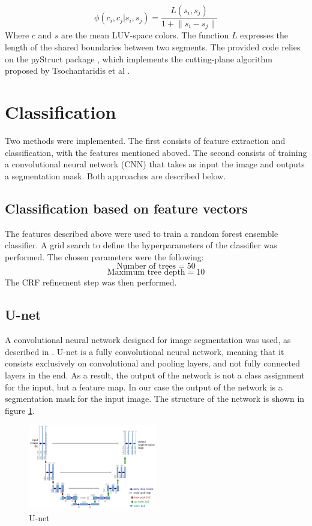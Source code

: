 \documentclass[10pt,conference,compsocconf]{IEEEtran}
\begin{document}
 \begin{equation}
\phi(c_i,c_j|s_i,s_j) = \frac{L(s_i,s_j)}{1+\lVert s_i - s_j \rVert}
 \end{equation}
Where \(c\) and \(s\) are the mean LUV-space colors. The function \(L\) expresses the length of the shared boundaries between two segments.
The provided code relies on the pyStruct package \cite{muller14}, which implements the cutting-plane algorithm proposed by Tsochantaridis et al \cite{tsochantaridis05}.
	\section{Classification}
	Two methods were implemented. The first consists of feature extraction and classification, with the features mentioned aboved. The second consists of training a convolutional neural network (CNN) that takes as input the image and outputs a segmentation mask. Both approaches are described below. 	
	
	\subsection{Classification based on feature vectors}
	The features described above were used to train a random forest ensemble classifier. A grid search to define the hyperparameters of the classifier was performed. The chosen parameters were the following:
	$$\text{Number of trees} = 50$$
	$$\text{Maximum tree depth} = 10$$
	The CRF refinement step was then performed.
	\subsection{U-net}
	A convolutional neural network designed for image segmentation was used, as
  described in \cite{unet}. U-net is a fully convolutional neural network,
  meaning that it consists exclusively on convolutional and pooling layers, and
  not fully connected layers in the end. As a result, the output of the network
  is not a class assignment for the input, but a feature map. In our case the
  output of the network is a segmentation mask for the input image. The
  structure of the network is shown in figure \ref{fig:unet_arch}.
		\begin{figure}[h]
			\centering
			\includegraphics[width=0.5\textwidth]{pics/unet.png}
			\caption{U-net~\cite{unet}}
			\label{fig:unet_arch}
		\end{figure}
\end{document}

